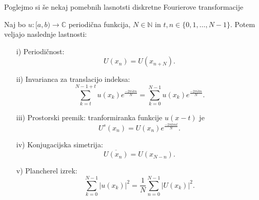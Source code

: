 \documentclass[mat2, tisk]{fmfdelo}
\newcommand{\N}{\mathbb N}
\newcommand{\C}{\mathbb C}
\begin{document}
Poglejmo si še nekaj pomebnih lasnotsti diskretne Fourierove transformacije
\begin{trditev}
Naj bo $u: [a, b) \rightarrow \C$ periodična funkcija, $N\in \N$ in\quad
$t, n \in \{0, 1, \dots, N-1\}$. Potem veljajo naslednje lastnosti:
\begin{enumerate}
  \item[i)] Periodičnost:
  \begin{equation}
    U(x_n) = U(x_{n + N}).
  \end{equation}
  \item[ii)] Invarianca za translacijo indeksa:
  \begin{equation}
  \sum_{k=t}^{N-1 + t} u(x_k) e^{\frac{-2\pi i k n}{N}} = \sum_{k=0}^{N-1} u(x_k) e^{\frac{-2\pi i k n}{N}}.
\end{equation}
  \item[iii)] Prostorski premik: tranformiranka funkcije $u(x - t)$ je
  \begin{equation}
  U^s(x_n) = U(x_n)e^{\frac{-2\pi k m t}{N}} .
\end{equation}
  \item[iv)] Konjugacijska simetrija: 
  \begin{equation}
    \overline{U(x_n)} = U(x_{N-n}).
  \end{equation}
  \item[v)] Plancherel izrek:
  \begin{equation}
    \sum_{k=0}^{N-1} |u(x_k)|^2 = \frac{1}{N}\sum_{n=0}^{N-1} |U(x_k)|^2.
  \end{equation}
\end{enumerate}
\end{trditev}
\end{document}
